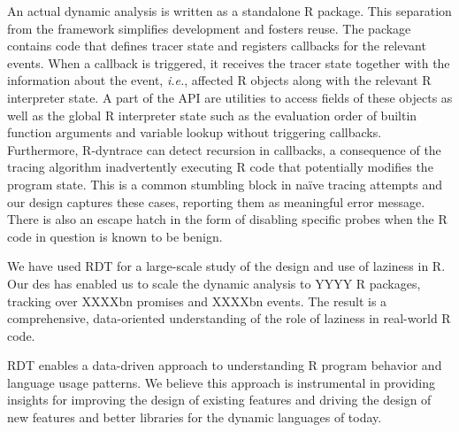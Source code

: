 \documentclass[acmsmall,review]{acmart}
\newcommand{\Ie}{\emph{i.e.}\xspace}
\newcommand{\RDT}{RDT\xspace}
\newcommand{\RDyntrace}{R-dyntrace\xspace}
\begin{document}
\indent An actual dynamic analysis is written as a standalone R package. This
separation from the framework simplifies development and fosters reuse. The
package contains code that defines tracer state and registers callbacks for the
relevant events. When a callback is triggered, it receives the tracer state
together with the information about the event, \Ie, affected R objects along
with the relevant R interpreter state. A part of the API are utilities to access
fields of these objects as well as the global R interpreter state such as the
evaluation order of builtin function arguments and variable lookup without
triggering callbacks. Furthermore, \RDyntrace can detect recursion in callbacks,
a consequence of the tracing algorithm inadvertently executing R code that
potentially modifies the program state. This is a common stumbling block in
na\"ive tracing attempts and our design captures these cases, reporting them as
meaningful error message. There is also an escape hatch in the form of disabling
specific probes when the R code in question is known to be benign.

We have used \RDT for a large-scale study of the design and use of laziness in
R. Our des has enabled us to scale the dynamic analysis to YYYY R packages,
tracking over XXXXbn promises and XXXXbn events. The result is a comprehensive,
data-oriented understanding of the role of laziness in real-world R code.

\RDT enables a data-driven approach to understanding R program behavior and
language usage patterns. We believe this approach is instrumental in providing
insights for improving the design of existing features and driving the design of
new features and better libraries for the dynamic languages of today.
\end{document}
